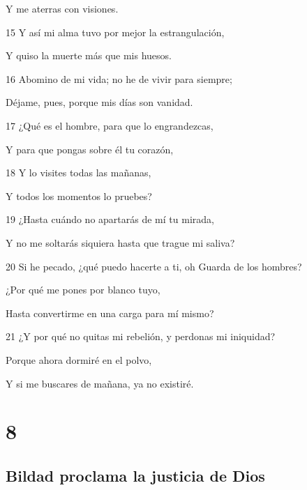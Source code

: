 \par Y me aterras con visiones.
\par 15 Y así mi alma tuvo por mejor la estrangulación,
\par Y quiso la muerte más que mis huesos.
\par 16 Abomino de mi vida; no he de vivir para siempre;
\par Déjame, pues, porque mis días son vanidad.
\par 17 ¿Qué es el hombre, para que lo engrandezcas,
\par Y para que pongas sobre él tu corazón, 
\par 18 Y lo visites todas las mañanas,
\par Y todos los momentos lo pruebes?
\par 19 ¿Hasta cuándo no apartarás de mí tu mirada,
\par Y no me soltarás siquiera hasta que trague mi saliva?
\par 20 Si he pecado, ¿qué puedo hacerte a ti, oh Guarda de los hombres?
\par ¿Por qué me pones por blanco tuyo,
\par Hasta convertirme en una carga para mí mismo?
\par 21 ¿Y por qué no quitas mi rebelión, y perdonas mi iniquidad?
\par Porque ahora dormiré en el polvo,
\par Y si me buscares de mañana, ya no existiré.

\chapter{8}

\section*{Bildad proclama la justicia de Dios}

